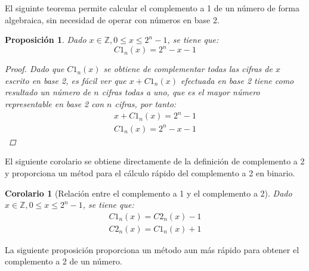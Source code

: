 \documentclass[spanish,a4paper,12pt,titlepage]{article}
\newtheorem{proposition}[theorem]{Proposición}
\newtheorem{corollary}[theorem]{Corolario}
\theoremstyle{definition}
\theoremstyle{remark}
\newcommand{\bbZ}{\mathbb{Z}}
\begin{document}
El siguinte teorema permite calcular el complemento a 1 de un número de forma algebraica, sin necesidad de operar con números en base 2.

\begin{proposition}
  Dado $x \in \bbZ, 0 \le x \le 2^n-1$, se tiene que:
  \[
    C1_n(x) = 2^n - x - 1
  \]
  \begin{proof}
    Dado que $C1_n(x)$ se obtiene de complementar todas las cifras de $x$ escrito en base 2, es fácil ver que $x+C1_n(x)$ efectuada en base 2 tiene como resultado un número de $n$ cifras todas a uno, que es el mayor número representable en base 2 con $n$ cifras, por tanto:
    \begin{align*}
        x + C1_n(x) = 2^n - 1\\
        C1_n(x) = 2^n - x - 1
    \end{align*}
  \end{proof}
\end{proposition}

El siguiente corolario se obtiene directamente de la definición de complemento a 2 y proporciona un métod para el cálculo rápido del complemento a 2 en binario.

\begin{corollary}[Relación entre el complemento a 1 y el complemento a 2]\label{c1-c2-relation}
  Dado $x \in \bbZ, 0 \le x \le 2^n-1$, se tiene que:
  \begin{align*}
    C1_n(x) = C2_n(x) - 1\\
    C2_n(x) = C1_n(x) + 1
  \end{align*}
\end{corollary}

La siguiente proposición proporciona un método aun más rápido para obtener el complemento a 2 de un número.
\end{document}
